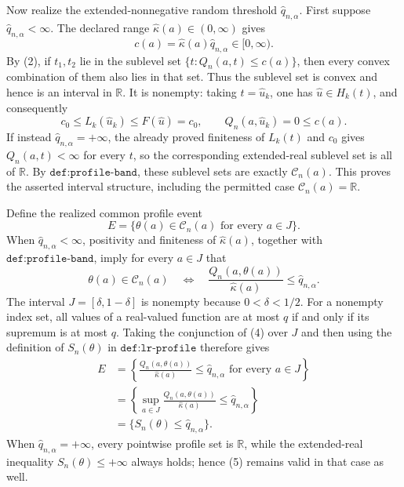 Now realize the extended-nonnegative random threshold \(\widehat q_{n,\alpha}\).  First suppose \(\widehat q_{n,\alpha}<\infty\).  The declared range \(\widehat\kappa(a)\in(0,\infty)\) gives
\[
 c(a)=\widehat\kappa(a)\widehat q_{n,\alpha}\in[0,\infty).
\]
By (2), if \(t_1,t_2\) lie in the sublevel set \(\{t:Q_n(a,t)\le c(a)\}\), then every convex combination of them also lies in that set.  Thus the sublevel set is convex and hence is an interval in \(\mathbb R\).  It is nonempty: taking \(t=\widehat u_k\), one has \(\widehat u\in H_k(t)\), and consequently
\[
 c_0\le L_k(\widehat u_k)\le F(\widehat u)=c_0,
 \qquad
 Q_n(a,\widehat u_k)=0\le c(a).                              \tag{3}
\]
If instead \(\widehat q_{n,\alpha}=+\infty\), the already proved finiteness of \(L_k(t)\) and \(c_0\) gives \(Q_n(a,t)<\infty\) for every \(t\), so the corresponding extended-real sublevel set is all of \(\mathbb R\).  By \(\texttt{def:profile-band}\), these sublevel sets are exactly \(\mathcal C_n(a)\).  This proves the asserted interval structure, including the permitted case \(\mathcal C_n(a)=\mathbb R\).

Define the realized common profile event
\[
 E=\{\theta(a)\in\mathcal C_n(a)\text{ for every }a\in J\}.
\]
When \(\widehat q_{n,\alpha}<\infty\), positivity and finiteness of \(\widehat\kappa(a)\), together with \(\texttt{def:profile-band}\), imply for every \(a\in J\) that
\[
 \theta(a)\in\mathcal C_n(a)
 \quad\Longleftrightarrow\quad
 \frac{Q_n(a,\theta(a))}{\widehat\kappa(a)}
 \le \widehat q_{n,\alpha}.                                 \tag{4}
\]
The interval \(J=[\delta,1-\delta]\) is nonempty because \(0<\delta<1/2\).  For a nonempty index set, all values of a real-valued function are at most \(q\) if and only if its supremum is at most \(q\).  Taking the conjunction of (4) over \(J\) and then using the definition of \(S_n(\theta)\) in \(\texttt{def:lr-profile}\) therefore gives
\[
 \begin{aligned}
 E
 &=\left\{\frac{Q_n(a,\theta(a))}{\widehat\kappa(a)}
       \le\widehat q_{n,\alpha}\text{ for every }a\in J\right\}\\
 &=\left\{\sup_{a\in J}
       \frac{Q_n(a,\theta(a))}{\widehat\kappa(a)}
       \le\widehat q_{n,\alpha}\right\}\\
 &=\{S_n(\theta)\le\widehat q_{n,\alpha}\}.                 \tag{5}
 \end{aligned}
\]
When \(\widehat q_{n,\alpha}=+\infty\), every pointwise profile set is \(\mathbb R\), while the extended-real inequality \(S_n(\theta)\le+\infty\) always holds; hence (5) remains valid in that case as well.

